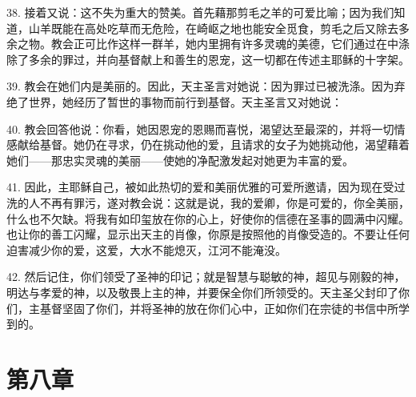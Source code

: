 38. 接着又说：这不失为重大的赞美。首先藉那剪毛之羊的可爱比喻；因为我们知道，山羊既能在高处吃草而无危险，在崎岖之地也能安全觅食，剪毛之后又除去多余之物。教会正可比作这样一群羊，她内里拥有许多灵魂的美德，它们通过在中涤除了多余的罪过，并向基督献上和善生的恩宠，这一切都在传述主耶稣的十字架。\par

39. 教会在她们内是美丽的。因此，天主圣言对她说：因为罪过已被洗涤。因为弃绝了世界，她经历了暂世的事物而前行到基督。天主圣言又对她说：\par

40. 教会回答他说：你看，她因恩宠的恩赐而喜悦，渴望达至最深的，并将一切情感献给基督。她仍在寻求，仍在挑动他的爱，且请求的女子为她挑动他，渴望藉着她们——那忠实灵魂的美丽——使她的净配激发起对她更为丰富的爱。\par

41. 因此，主耶稣自己，被如此热切的爱和美丽优雅的可爱所邀请，因为现在受过洗的人不再有罪污，遂对教会说：这就是说，我的爱卿，你是可爱的，你全美丽，什么也不欠缺。将我有如印玺放在你的心上，好使你的信德在圣事的圆满中闪耀。也让你的善工闪耀，显示出天主的肖像，你原是按照他的肖像受造的。不要让任何迫害减少你的爱，这爱，大水不能熄灭，江河不能淹没。\par

42. 然后记住，你们领受了圣神的印记；就是智慧与聪敏的神，超见与刚毅的神，明达与孝爱的神，以及敬畏上主的神，并要保全你们所领受的。天主圣父封印了你们，主基督坚固了你们，并将圣神的放在你们心中，正如你们在宗徒的书信中所学到的。\par


\section{第八章}

